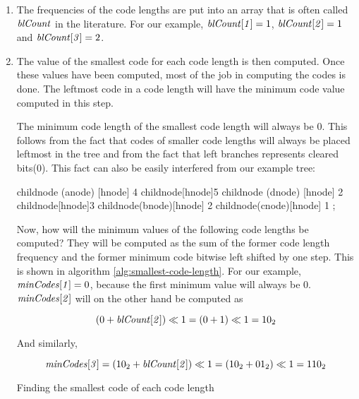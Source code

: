 \begin{enumerate}
\item The frequencies of the code lengths are put into an array that
  is often called $\mathit{blCount}$ in the  literature. For our
  example, $\mathit{blCount[1]} = 1$, $\mathit{blCount[2]} = 1$ and
  $\mathit{blCount[3]} = 2$.

\item The value of the smallest code for each code length is then
  computed. Once these values have been computed, most of the job in
  computing the codes is done. The leftmost code in a code length will
  have the minimum code value computed in this step.

  The minimum code length of the smallest code length will always be
  $0$. This follows from the fact that codes of smaller code lengths
  will always be placed leftmost in the tree and from the fact that
  left branches represents cleared bits($0$). This fact can also be
  easily interfered from our example tree:

\begin{huffmanc}
  child{node (anode) [hnode] {4}}
  child{node[hnode]{5}
    child{node (dnode) [hnode] {2}}
    child{node[hnode]{3}
      child{node(bnode)[hnode] {2}}
      child{node(cnode)[hnode] {1}}
    }};

\end{huffmanc}

Now, how will the minimum values of the following code lengths be
computed? They will be computed as the sum of the former code length
frequency and the former minimum code bitwise left shifted by one
step. This is shown in algorithm \ref{alg:smallest-code-length}. For
our example, $\mathit{minCodes[1]} = 0$, because the first minimum value
will always be 0. $\mathit{minCodes[2]}$ will on the other hand be
computed as

  \begin{equation*}
    (0 + \mathit{blCount[2]}) \ll 1 = (0 + 1)
    \ll 1 = \mbox{\ensuremath{10_2}}
  \end{equation*}

  And similarly,

  \begin{equation*}
    \mathit{minCodes[3]} =  (\mbox{\ensuremath{10_2}} + \mathit{blCount[2]}) \ll 1 =
      (\mbox{\ensuremath{10_2}} + \mbox{\ensuremath{01_2}}) \ll 1 = \mbox{\ensuremath{110_2}}
  \end{equation*}

  \begin{algorithm}[H]
    \caption{Finding the smallest code of each code length}\algohack{}    \label{alg:smallest-code-length}
    \begin{algorithmic}[1]
       


\end{algorithmic}
\end{algorithm}
\end{enumerate}
